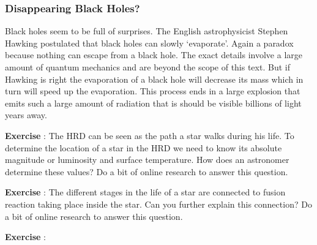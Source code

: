\subsubsection{Disappearing Black Holes?}
Black holes seem to be full of surprises. The English astrophysicist Stephen Hawking postulated that black holes can slowly `evaporate'. Again a paradox because nothing can escape from a black hole. The exact details involve a large amount of quantum mechanics and are beyond the scope of this text. But if Hawking is right the evaporation of a black hole will decrease its mass which in turn will speed up the evaporation. This process ends in a large explosion that emits such a large amount of radiation that is should be visible billions of light years away.

\begin{shaded}
\textbf{Exercise \theExercise {}} : The HRD can be seen as the path a star walks during his life. To determine the location of a star in the HRD we need to know its absolute magnitude or luminosity and surface temperature. How does an astronomer determine these values? Do a bit of online research to answer this question.\end{shaded}

\begin{shaded}
\textbf{Exercise \theExercise {}} : The different stages in the life of a star are connected to fusion reaction taking place inside the star. Can you further explain this connection? Do a bit of online research to answer this question.\end{shaded}




\begin{shaded}
\textbf{Exercise \theExercise {}} : \end{shaded}

\footnotemark
\footnotetext{}

